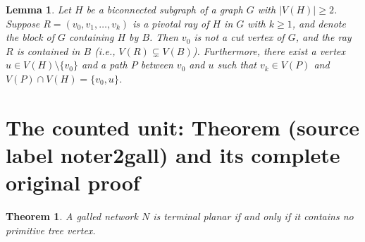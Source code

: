 \documentclass[10pt,a4paper]{amsart}
\theoremstyle{plain}
\theoremstyle{thmstyleone}
\newtheorem{theorem}{Theorem}
\theoremstyle{thmstyletwo}
\newtheorem{lemma}{Lemma}
\theoremstyle{thmstylethree}
\begin{document}
\begin{lemma}\label{lmm:cutvis-block}
Let $H$ be a biconnected subgraph of a graph $G$ with $|V(H)|\ge 2$. 
Suppose $R=(v_0,v_1,\dots,v_k)$ is a pivotal ray of $H$ in $G$ with $k\ge 1$, and denote the block of $G$ containing $H$ by $B$.
Then $v_0$ is not a cut vertex of $G$, and the ray $R$ is contained in $B$ (i.e., $V(R)\subsetneq V(B)$). 
Furthermore, there exist a vertex $u\in V(H)\setminus\{v_0\}$ and a path $P$ between $v_0$ and $u$ such that $v_k\in V(P)$ and $V(P)\cap V(H)=\{v_0,u\}$.

\end{lemma}


\section{The counted unit: Theorem (source label noter2gall) and its complete original proof}

\begin{theorem}\label{noter2gall}
A galled network $N$ is terminal planar if and only if it contains no primitive tree vertex.
\end{theorem}
\end{document}
